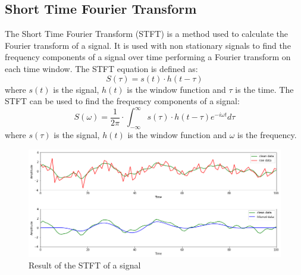 \documentclass[a4paper, noexaminfo]{sapthesis}
\begin{document}
\subsection{Short Time Fourier Transform}\label{sec:stft}
The Short Time Fourier Transform (STFT)\cite{stft}\cite{stft2}
is a method used to calculate the
Fourier transform of a signal. It is used with non stationary signals
to find the frequency components of a signal over time performing 
a Fourier transform on each time window.
The STFT equation is defined as:
\begin{equation}
\label{eq:stft}
S(\tau) = s(t) \cdot h(t-\tau)
\end{equation}
where $s(t)$ is the signal, $h(t)$ is the window function and $\tau$ is
the time. \newline
The STFT can be used to find the frequency components of a signal:
\begin{equation}
\label{eq:stft2}
S(\omega)= \frac{1}{2\pi}\cdot \int_{-\infty}^{\infty} s(\tau) \cdot h(t-\tau) e^{-i\omega t} d\tau
\end{equation}
where $s(\tau)$ is the signal, $h(t)$ is the window function and $\omega$
is the frequency. \newline
\begin{figure}[h]
  \includegraphics[scale=0.45]{stft_waves_result}
  \centering
  \caption{Result of the STFT of a signal
  }\label{fig:stft} 
  \end{figure}
\end{document}
